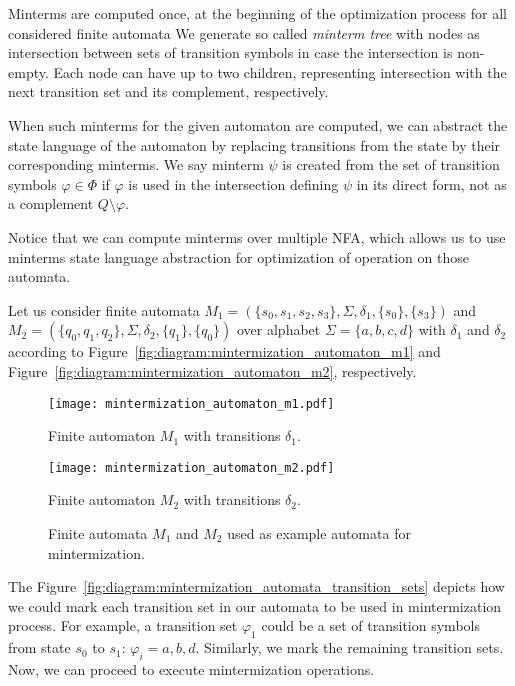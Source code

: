 Minterms are computed once, at the beginning of the optimization process for all considered finite automata
We generate so called \emph{minterm tree} with nodes as intersection between sets of transition symbols in case the intersection is non-empty. Each node can have up to two children, representing intersection with the next transition set and its complement, respectively.

When such minterms for the given automaton are computed, we can abstract the state language of the automaton by replacing transitions from the state by their corresponding minterms. We say minterm $\psi$ is created from the set of transition symbols $\varphi \in \Phi$ if $\varphi$ is used in the intersection defining $\psi$ in its direct form, not as a complement $Q \setminus \varphi$.

Notice that we can compute minterms over multiple NFA, which allows us to use minterms state language abstraction for optimization of operation on those automata.

Let us consider finite automata $M_1 = (\{s_0, s_1, s_2, s_3\}, \Sigma, \delta_1, \{s_0\}, \{s_3\})$ and $M_2 = (\{q_0, q_1, q_2\}, \Sigma, \delta_2, \{q_1\}, \{q_0\})$ over alphabet $\Sigma = \{a, b, c, d\}$ with $\delta_1$ and $\delta_2$ according to Figure~\ref{fig:diagram:mintermization_automaton_m1} and Figure~\ref{fig:diagram:mintermization_automaton_m2}, respectively.

\begin{figure*}[ht]
    \centering
    \begin{minipage}{0.49\linewidth}
        \centering
        \texttt{[image: mintermization\_automaton\_m1.pdf]}
        \caption{Finite automaton $M_1$ with transitions $\delta_1$.}
        \label{fig:diagram:mintermization_automaton_m1}
    \end{minipage}
    \hfill
    \begin{minipage}{0.49\linewidth}
        \centering
        \texttt{[image: mintermization\_automaton\_m2.pdf]}
        \caption{Finite automaton $M_2$ with transitions $\delta_2$.}
        \label{fig:diagram:mintermization_automaton_m2}
    \end{minipage}
    \vspace{0.5cm}
    \caption{Finite automata $M_1$ and $M_2$ used as example automata for mintermization.}
    \label{fig:diagram:mintermization_automata}
\end{figure*}

The Figure~\ref{fig:diagram:mintermization_automata_transition_sets} depicts how we could mark each transition set in our automata to be used in mintermization process. For example, a transition set $\varphi_1$ could be a set of transition symbols from state $s_0$ to $s_1$: $\varphi_i = {a, b, d}$. Similarly, we mark the remaining transition sets. Now, we can proceed to execute mintermization operations.


